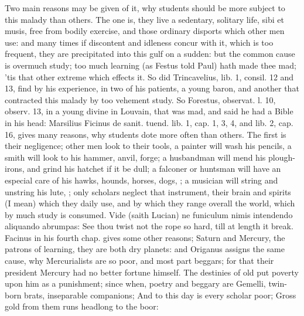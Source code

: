 {Two main reasons may be given of it, why students should be more
subject to this malady than others. The one is, they live a sedentary,
solitary life, sibi et musis, free from bodily exercise, and those
ordinary disports which other men use: and many times if discontent and
idleness concur with it, which is too frequent, they are precipitated
into this gulf on a sudden: but the common cause is overmuch study; too
much learning (as Festus told Paul) hath made thee mad; 'tis that
other extreme which effects it. So did Trincavelius, lib. 1, consil. 12
and 13, find by his experience, in two of his patients, a young baron,
and another that contracted this malady by too vehement study. So
Forestus, observat. l. 10, observ. 13, in a young divine in Louvain,
that was mad, and said he had a Bible in his head: Marsilius
Ficinus de sanit. tuend. lib. 1, cap. 1, 3, 4, and lib. 2, cap. 16,
gives many reasons,  why students dote more often than others.
The first is their negligence; other men look to their tools, a
painter will wash his pencils, a smith will look to his hammer, anvil,
forge; a husbandman will mend his plough-irons, and grind his hatchet
if it be dull; a falconer or huntsman will have an especial care of his
hawks, hounds, horses, dogs, \etc{}; a musician will string and unstring
his lute, \etc{}; only scholars neglect that instrument, their brain and
spirits (I mean) which they daily use, and by which they range overall
the world, which by much study is consumed. Vide (saith Lucian) ne
funiculum nimis intendendo aliquando abrumpas: See thou twist not the
rope so hard, till at length it break. Facinus in his fourth
chap. gives some other reasons; Saturn and Mercury, the patrons of
learning, they are both dry planets: and Origanus assigns the same
cause, why Mercurialists are so poor, and most part beggars; for that
their president Mercury had no better fortune himself. The destinies of
old put poverty upon him as a punishment; since when, poetry and
beggary are Gemelli, twin-born brats, inseparable companions;
And to this day is every scholar poor;
Gross gold from them runs headlong to the boor:

}
